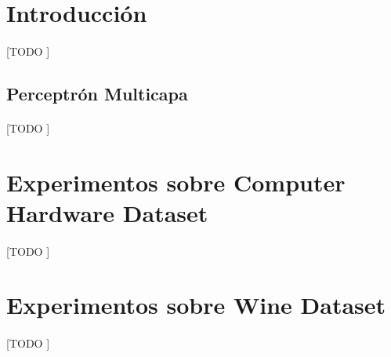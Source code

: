 \documentclass{article}
\begin{document}
	\maketitle %

	\thispagestyle{fancy} %



	\begin{abstract}
		\noindent [TODO ]
	\end{abstract}



	\section{Introducción}
	\label{sec:introducción}

		\paragraph{}
		[TODO ]

		\subsection{Perceptrón Multicapa}
		\label{sec:multilayer-perceptron}

			\paragraph{}
			[TODO ]

	\section{Experimentos sobre Computer Hardware Dataset}
	\label{sec:e1}

		\paragraph{}
		[TODO ]

	\section{Experimentos sobre Wine Dataset}
	\label{sec:e2}

		\paragraph{}
		[TODO ]
	\nocite{subject:taa}
	\nocite{garciparedes:machine-learning-multilayer-perceptron}
	\nocite{dataset:computer-hardware}
	\nocite{dataset:wine}
  
  
\end{document}
